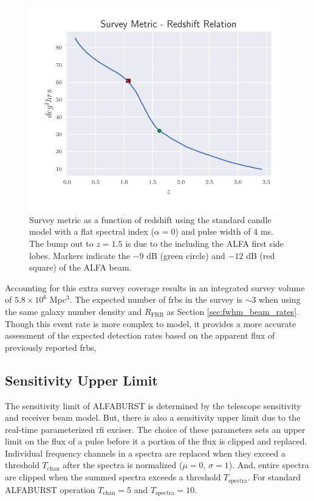 \documentclass[a4paper,fleqn,usenatbib]{mnras}
\begin{document}
\begin{figure}
    \includegraphics[width=1.0\linewidth]{figures/full_sefd_z_relation.pdf}
    \caption{Survey metric as a function of redshift using the standard candle
    model with a flat spectral index ($\alpha=0$) and pulse width of 4 ms. The
    bump out to $z=1.5$ is due to the including the ALFA first side lobes.
    Markers indicate the $-9$ dB (green circle) and $-12$ dB (red square) of the
    ALFA beam.
    }
    \label{fig:full_sefd_z}
\end{figure}

Accounting for this extra survey coverage results in an integrated survey volume
of $5.8 \times 10^6$ Mpc$^3$. The expected number of \glspl{frb} in the survey is
$\sim 3$ when using the same galaxy number density and $R_{\textrm{FRB}}$ as
Section \ref{sec:fwhm_beam_rates}. Though this event rate is more complex to
model, it provides a more accurate assessment of the expected detection rates
based on the apparent flux of previously reported \glspl{frb},

\subsection{Sensitivity Upper Limit}
\label{sec:upper_limit}

The sensitivity limit of ALFABURST is determined by the telescope sensitivity and
receiver beam model. But, there is also a sensitivity upper limit due to the
real-time parameterized \gls{rfi} exciser. The choice of these parameters sets
an upper limit on the flux of a pulse before it a portion of the flux is clipped
and replaced. Individual frequency channels in a spectra are replaced when they
exceed a threshold $T_{\textrm{chan}}$ after the spectra is normalized ($\mu=0$,
$\sigma=1$). And, entire spectra are clipped when the summed spectra exceeds a
threshold $T_{\textrm{spectra}}$. For standard ALFABURST operation
$T_{\textrm{chan}} = 5$ and $T_{\textrm{spectra}} = 10$.
\end{document}
